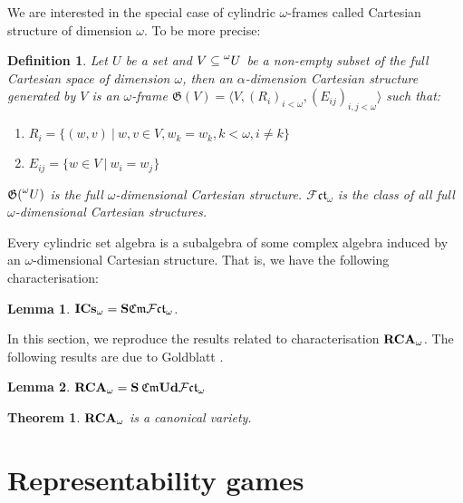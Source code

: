 \documentclass[a4paper]{article}
\theoremstyle{defin}
\newtheorem{defin}{Definition}
\theoremstyle{theorem}
\newtheorem{theorem}{Theorem}
\theoremstyle{prop}
\theoremstyle{lemma}
\newtheorem{lemma}{Lemma}
\theoremstyle{fact}
\theoremstyle{ex}
\theoremstyle{col}
\begin{document}
We are interested in the special case of cylindric $\omega$-frames called Cartesian structure of dimension $\omega$. To be more precise:

\begin{defin}
Let $U$ be a set and $V \subseteq \prescript{\omega}{}U$ be a non-empty subset of the full Cartesian space of dimension $\omega$, then an $\alpha$-dimension Cartesian structure generated by $V$ is an $\omega$-frame $\mathfrak{G}(V) = \langle V, (R_{i})_{i < \omega}, (E_{ij})_{i, j < \omega} \rangle$ such that:
\begin{enumerate}
\item $R_i = \{ (w, v) \: | \: w, v \in V, w_k = w_k, k < \omega, i \neq k \}$
\item $E_{ij} = \{ w \in V \: | \: w_i = w_j \}$
\end{enumerate}
$\mathfrak{G}(\prescript{\omega}{}U)$ is the full $\omega$-dimensional Cartesian structure. $\mathcal{F} \mathfrak{c}\mathfrak{t}_{\omega}$ is the class of all full $\omega$-dimensional Cartesian structures.
\end{defin}

Every cylindric set algebra is a subalgebra of some complex algebra induced by an $\omega$-dimensional Cartesian structure. That is, we have the following characterisation:

\begin{lemma}
${\bf I}{\bf Cs}_{\omega} = {\bf S} \mathfrak{Cm} \mathcal{F} \mathfrak{c}\mathfrak{t}_{\omega}$.
\end{lemma}

In this section, we reproduce the results related to characterisation ${\bf RCA}_{\omega}$. The following results are due to Goldblatt \cite{goldblatt1995elementary}.

\begin{lemma}
${\bf RCA}_{\omega} = {\bf S} \: \mathfrak{Cm} {\bf Ud} \mathcal{F} \mathfrak{ct}_{\omega}$
\end{lemma}

\begin{theorem}
${\bf RCA}_{\omega}$ is a canonical variety.
\end{theorem}

\section{Representability games}



\end{document}
